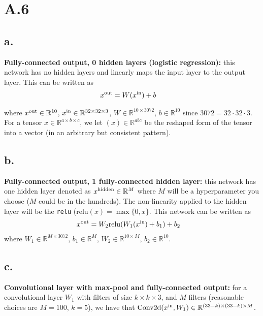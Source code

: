 \documentclass{article}
\newcommand{\field}[1]{\mathbb{#1}}
\newcommand{\1}{\mathbf{1}}
\newcommand{\R}{\field{R}} %
\begin{document}
\section*{A.6}
{\Large 

\subsection*{a.}

\textbf{Fully-connected output, 0 hidden layers (logistic regression):} this network has no hidden layers and linearly maps the input layer to the output layer. This can be written as 
  \begin{align*}
    x^{\rm out} &= W (x^{\rm in}) +b
  \end{align*} 
  
  where $x^{\rm out} \in \R^{10}$, $x^{\rm in} \in \R^{32 \times 32 \times 3}$, $W \in \R^{10 \times 3072}$, $b \in \R^{10}$ since $3072 = 32 \cdot 32 \cdot 3$. For a tensor $x \in \R^{a \times b \times c}$, we let $(x) \in \R^{a b c}$ be the reshaped form of the tensor into a vector (in an arbitrary but consistent pattern).

\subsection*{b.}

\textbf{Fully-connected output, 1 fully-connected hidden layer:} this network has one hidden layer denoted as $x^{\rm hidden} \in \R^{M}$ where $M$ will be a hyperparameter you choose ($M$ could be in the hundreds). The non-linearity applied to the hidden layer will be the \texttt{relu} ($\mathrm{relu}(x) = \max\{0,x\}$. This network can be written as
  \begin{align*}
    x^{\rm out} &= W_2 \mathrm{relu}(W_1 (x^{\rm in}) +b_1) + b_2
  \end{align*}
  where $W_1 \in \R^{M \times 3072}$, $b_1 \in \R^M$, $W_2 \in \R^{10 \times M}$, $b_2 \in \R^{10}$.

\subsection*{c.}

\textbf{Convolutional layer with max-pool and fully-connected output:} for a convolutional layer $W_1$ with filters of size $k \times k \times 3$, and $M$ filters (reasonable choices are $M=100$, $k=5$), we have that $\mathrm{Conv2d}(x^{\rm in}, W_1) \in \R^{(33-k) \times (33-k) \times M}$.
  
}
\end{document}
